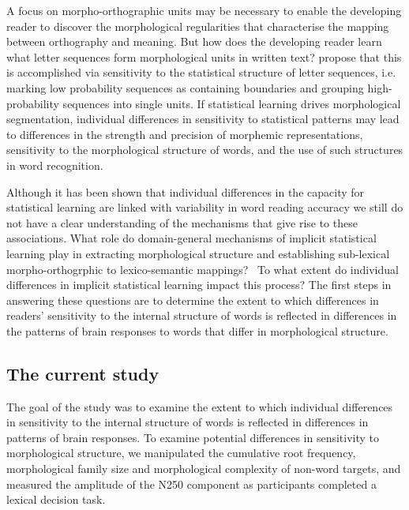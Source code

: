 \documentclass[review]{elsarticle}
\begin{document}
A focus on morpho-orthographic units may be necessary to enable the developing reader to discover the morphological regularities that characterise the mapping between orthography and meaning.  But how does the developing reader learn what letter sequences form morphological units in written text?  {\renewcommand\&{and}\citet{rastleMorphologicalDecompositionBased2008}} propose that this is accomplished via sensitivity to the statistical structure of letter sequences, i.e. marking low probability sequences as containing boundaries and  grouping high- probability sequences into single units. If statistical learning drives morphological segmentation, individual differences in sensitivity to statistical patterns may lead to differences in the strength and precision of morphemic representations,  sensitivity to the morphological structure of words,  and the use of such structures in word recognition. 

Although it has been shown that individual differences in the capacity for statistical learning are linked with variability in word reading accuracy \citep{arciuliReadingStatisticalLearning2018, arciuliStatisticalLearningRelated2012} we still do not have a clear understanding of the mechanisms that give rise to these associations. What role do domain-general mechanisms of implicit statistical learning play in extracting morphological structure and establishing sub-lexical morpho-orthogrphic to lexico-semantic mappings?  To what extent do individual differences in implicit statistical learning impact this process? The first steps in answering these questions are to determine the extent to which differences in readers’ sensitivity to the internal structure of words is reflected in differences in the patterns of brain responses to words that differ in morphological structure. 

\subsection{The current study}

The goal of the study was to examine the extent to which  individual differences in sensitivity to the internal structure of words is reflected in differences in  patterns of brain responses. To examine potential differences in sensitivity to morphological structure, we manipulated the cumulative root frequency, morphological family size and morphological complexity of non-word targets, and measured the amplitude of the N250 component as participants completed a lexical decision task.  
\end{document}
